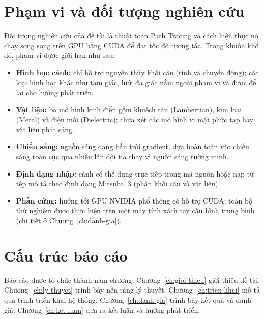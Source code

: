 \section{Phạm vi và đối tượng nghiên cứu}
Đối tượng nghiên cứu của đề tài là thuật toán Path Tracing và cách hiện thực nó
chạy song song trên GPU bằng CUDA để đạt tốc độ tương tác. Trong khuôn khổ đó,
phạm vi được giới hạn như sau:
\begin{itemize}[noitemsep]
  \item \textbf{Hình học cảnh:} chỉ hỗ trợ nguyên thủy khối cầu (tĩnh và chuyển
        động); các loại hình học khác như tam giác, lưới đa giác nằm ngoài phạm vi
        và được để lại cho hướng phát triển.
  \item \textbf{Vật liệu:} ba mô hình kinh điển gồm khuếch tán (Lambertian), kim
        loại (Metal) và điện môi (Dielectric); chưa xét các mô hình vi mặt phức
        tạp hay vật liệu phát sáng.
  \item \textbf{Chiếu sáng:} nguồn sáng dạng bầu trời gradient, dựa hoàn toàn vào
        chiếu sáng toàn cục qua nhiều lần dội tia thay vì nguồn sáng tường minh.
  \item \textbf{Định dạng nhập:} cảnh có thể dựng trực tiếp trong mã nguồn hoặc
        nạp từ tệp mô tả theo định dạng Mitsuba~3 (phần khối cầu và vật liệu).
  \item \textbf{Phần cứng:} hướng tới GPU NVIDIA phổ thông có hỗ trợ CUDA; toàn
        bộ thử nghiệm được thực hiện trên một máy tính xách tay cấu hình trung
        bình (chi tiết ở Chương~\ref{ch:danh-gia}).
\end{itemize}

\section{Cấu trúc báo cáo}
Báo cáo được tổ chức thành năm chương. Chương~\ref{ch:gioi-thieu} giới thiệu đề tài.
Chương~\ref{ch:ly-thuyet} trình bày nền tảng lý thuyết. Chương~\ref{ch:trien-khai}
mô tả quá trình triển khai hệ thống. Chương~\ref{ch:danh-gia} trình bày kết quả
và đánh giá. Chương~\ref{ch:ket-luan} đưa ra kết luận và hướng phát triển.
